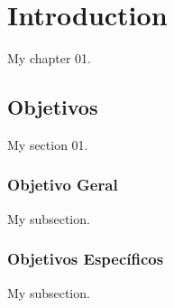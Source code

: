 \chapter{Introduction}

My chapter 01.

\section{Objetivos}

My section 01.

\subsection{Objetivo Geral}

My subsection.

\subsection{Objetivos Específicos}

My subsection.